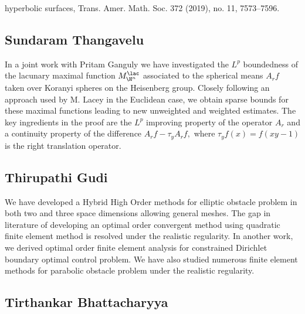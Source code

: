 hyperbolic surfaces, Trans. Amer. Math. Soc. 372 (2019), no. 11, 7573–7596.


\subsection{Sundaram Thangavelu}

In a joint work with Pritam Ganguly  we have investigated the $ L^p $  boundedness of the lacunary maximal function $ M_{\H^n}^\lac $ associated to the spherical means $ A_r f$  taken over Koranyi spheres on the Heisenberg group. Closely following an approach used by M. Lacey in the Euclidean case, we obtain sparse bounds for these maximal functions leading to new unweighted and weighted estimates. The key ingredients in the proof are the $L^p$  improving property of the operator $ A_r $  and a continuity property of the difference $ A_r f−\tau_y A_r f,$ where $\tau_yf(x)=f(xy−1) $ is the right translation operator.


\subsection{Thirupathi Gudi}

We have developed a Hybrid High Order methods for elliptic obstacle problem in both two and three space dimensions allowing general meshes. The gap in literature of developing an optimal order convergent method using quadratic finite element method is resolved under the realistic regularity. In another work, we derived optimal order finite element analysis for constrained Dirichlet boundary optimal control problem. We have also studied numerous finite element methods for parabolic obstacle problem under the realistic regularity.


\subsection{Tirthankar Bhattacharyya}

